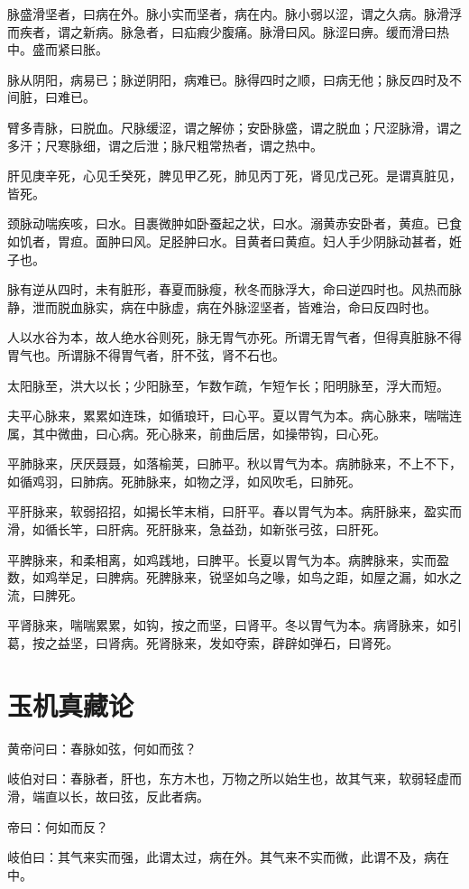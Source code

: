 \documentclass{article}%
\begin{document}
脉盛滑坚者，曰病在外。脉小实而坚者，病在内。脉小弱以涩，谓之久病。脉滑浮而疾者，谓之新病。脉急者，曰疝瘕少腹痛。脉滑曰风。脉涩曰痹。缓而滑曰热中。盛而紧曰胀。

脉从阴阳，病易已；脉逆阴阳，病难已。脉得四时之顺，曰病无他；脉反四时及不间脏，曰难已。

臂多青脉，曰脱血。尺脉缓涩，谓之解㑊；安卧脉盛，谓之脱血；尺涩脉滑，谓之多汗；尺寒脉细，谓之后泄；脉尺粗常热者，谓之热中。

肝见庚辛死，心见壬癸死，脾见甲乙死，肺见丙丁死，肾见戊己死。是谓真脏见，皆死。

颈脉动喘疾咳，曰水。目裹微肿如卧蚕起之状，曰水。溺黄赤安卧者，黄疸。已食如饥者，胃疸。面肿曰风。足胫肿曰水。目黄者曰黄疸。妇人手少阴脉动甚者，姙子也。

脉有逆从四时，未有脏形，春夏而脉瘦，秋冬而脉浮大，命曰逆四时也。风热而脉静，泄而脱血脉实，病在中脉虚，病在外脉涩坚者，皆难治，命曰反四时也。

人以水谷为本，故人绝水谷则死，脉无胃气亦死。所谓无胃气者，但得真脏脉不得胃气也。所谓脉不得胃气者，肝不弦，肾不石也。

太阳脉至，洪大以长；少阳脉至，乍数乍疏，乍短乍长；阳明脉至，浮大而短。

夫平心脉来，累累如连珠，如循琅玕，曰心平。夏以胃气为本。病心脉来，喘喘连属，其中微曲，曰心病。死心脉来，前曲后居，如操带钩，曰心死。

平肺脉来，厌厌聂聂，如落榆荚，曰肺平。秋以胃气为本。病肺脉来，不上不下，如循鸡羽，曰肺病。死肺脉来，如物之浮，如风吹毛，曰肺死。

平肝脉来，软弱招招，如揭长竿末梢，曰肝平。春以胃气为本。病肝脉来，盈实而滑，如循长竿，曰肝病。死肝脉来，急益劲，如新张弓弦，曰肝死。

平脾脉来，和柔相离，如鸡践地，曰脾平。长夏以胃气为本。病脾脉来，实而盈数，如鸡举足，曰脾病。死脾脉来，锐坚如乌之喙，如鸟之距，如屋之漏，如水之流，曰脾死。

平肾脉来，喘喘累累，如钩，按之而坚，曰肾平。冬以胃气为本。病肾脉来，如引葛，按之益坚，曰肾病。死肾脉来，发如夺索，辟辟如弹石，曰肾死。
\section{玉机真藏论}
黄帝问曰：春脉如弦，何如而弦？

岐伯对曰：春脉者，肝也，东方木也，万物之所以始生也，故其气来，软弱轻虚而滑，端直以长，故曰弦，反此者病。

帝曰：何如而反？

岐伯曰：其气来实而强，此谓太过，病在外。其气来不实而微，此谓不及，病在中。
\end{document}
